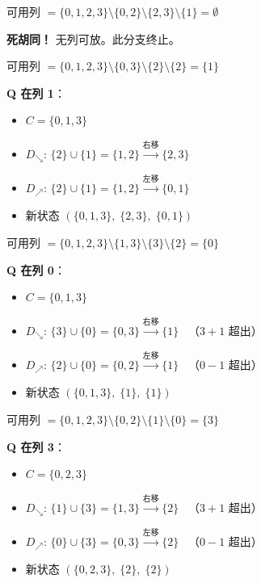 \documentclass[12pt,a4paper]{article}
\begin{document}
\begin{stepbox}[状态 1: $(\{0,2\},\;\{2,3\},\;\{1\})$ --- 来自 S1$\to$列2]
可用列 $= \{0,1,2,3\} \setminus \{0,2\} \setminus \{2,3\} \setminus \{1\} = \emptyset$

\textcolor{myred}{\textbf{死胡同！}} 无列可放。此分支终止。
\end{stepbox}

\begin{stepbox}[状态 2: $(\{0,3\},\;\{2\},\;\{2\})$ --- 来自 S1$\to$列3]
可用列 $= \{0,1,2,3\} \setminus \{0,3\} \setminus \{2\} \setminus \{2\} = \{1\}$

\textbf{Q 在列 1}：
\begin{itemize}[nosep]
  \item $C = \{0,1,3\}$
  \item $D_\searrow$: $\{2\} \cup \{1\} = \{1,2\} \xrightarrow{\text{右移}} \{2,3\}$
  \item $D_\nearrow$: $\{2\} \cup \{1\} = \{1,2\} \xrightarrow{\text{左移}} \{0,1\}$
  \item 新状态 $(\{0,1,3\},\;\{2,3\},\;\{0,1\})$
\end{itemize}
\end{stepbox}

\begin{stepbox}[状态 3: $(\{1,3\},\;\{3\},\;\{2\})$ --- 来自 S2$\to$列3]
可用列 $= \{0,1,2,3\} \setminus \{1,3\} \setminus \{3\} \setminus \{2\} = \{0\}$

\textbf{Q 在列 0}：
\begin{itemize}[nosep]
  \item $C = \{0,1,3\}$
  \item $D_\searrow$: $\{3\} \cup \{0\} = \{0,3\} \xrightarrow{\text{右移}} \{1\}$ \ \small（$3\!+\!1$ 超出）
  \item $D_\nearrow$: $\{2\} \cup \{0\} = \{0,2\} \xrightarrow{\text{左移}} \{1\}$ \ \small（$0\!-\!1$ 超出）
  \item 新状态 $(\{0,1,3\},\;\{1\},\;\{1\})$
\end{itemize}
\end{stepbox}

\begin{stepbox}[状态 4: $(\{0,2\},\;\{1\},\;\{0\})$ --- 来自 S3$\to$列0]
可用列 $= \{0,1,2,3\} \setminus \{0,2\} \setminus \{1\} \setminus \{0\} = \{3\}$

\textbf{Q 在列 3}：
\begin{itemize}[nosep]
  \item $C = \{0,2,3\}$
  \item $D_\searrow$: $\{1\} \cup \{3\} = \{1,3\} \xrightarrow{\text{右移}} \{2\}$ \ \small（$3\!+\!1$ 超出）
  \item $D_\nearrow$: $\{0\} \cup \{3\} = \{0,3\} \xrightarrow{\text{左移}} \{2\}$ \ \small（$0\!-\!1$ 超出）
  \item 新状态 $(\{0,2,3\},\;\{2\},\;\{2\})$
\end{itemize}
\end{stepbox}
\end{document}
